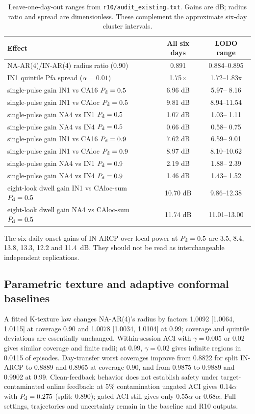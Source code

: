 \documentclass[10pt]{article}
\begin{document}
\begin{table}[htbp]
\centering\small\setlength{\tabcolsep}{4pt}
\caption{Leave-one-day-out ranges from \texttt{r10/audit\_existing.txt}. Gains are dB; radius ratio and spread are dimensionless. These complement the approximate six-day cluster intervals.}\label{tab:lodo}
\begin{tabular}{lcc}
\toprule
Effect & All six days & LODO range \\
\midrule
NA-AR(4)/IN-AR(4) radius ratio (0.90) & 0.891 & 0.884--0.895 \\
IN1 quintile Pfa spread ($\alpha=0.01$) & 1.75$\times$ & 1.72--1.83x \\
single-pulse gain IN1 vs CA16  $P_{\rm d}=0.5$ & 6.96 dB & 5.97-- 8.16 \\
single-pulse gain IN1 vs CAloc $P_{\rm d}=0.5$ & 9.81 dB & 8.94--11.54 \\
single-pulse gain NA4 vs IN1   $P_{\rm d}=0.5$ & 1.07 dB & 1.03-- 1.11 \\
single-pulse gain NA4 vs IN4   $P_{\rm d}=0.5$ & 0.66 dB & 0.58-- 0.75 \\
single-pulse gain IN1 vs CA16  $P_{\rm d}=0.9$ & 7.62 dB & 6.59-- 9.01 \\
single-pulse gain IN1 vs CAloc $P_{\rm d}=0.9$ & 8.97 dB & 8.10--10.62 \\
single-pulse gain NA4 vs IN1   $P_{\rm d}=0.9$ & 2.19 dB & 1.88-- 2.39 \\
single-pulse gain NA4 vs IN4   $P_{\rm d}=0.9$ & 1.46 dB & 1.43-- 1.52 \\
eight-look dwell gain IN1 vs CAloc-sum $P_{\rm d}=0.5$ & 10.70 dB & 9.86--12.38 \\
eight-look dwell gain NA4 vs CAloc-sum $P_{\rm d}=0.5$ & 11.74 dB & 11.01--13.00 \\
\bottomrule
\end{tabular}
\end{table}

The six daily onset gains of IN-ARCP over local power at $P_{\rm d}=0.5$ are 3.5, 8.4, 13.8, 13.3, 12.2 and 11.4~dB. They should not be read as interchangeable independent replications.

\subsection{Parametric texture and adaptive conformal baselines}
A fitted K-texture law changes NA-AR(4)'s radius by factors 1.0092 [1.0064, 1.0115] at coverage 0.90 and 1.0078 [1.0034, 1.0104] at 0.99; coverage and quintile deviations are essentially unchanged. Within-session ACI with $\gamma=0.005$ or 0.02 gives similar coverage and finite radii; at 0.99, $\gamma=0.02$ gives infinite regions in 0.0115 of episodes. Day-transfer worst coverages improve from 0.8822 for split IN-ARCP to 0.8889 and 0.8965 at coverage 0.90, and from 0.9875 to 0.9889 and 0.9902 at 0.99. Clean-feedback behavior does not establish safety under target-contaminated online feedback: at 5\% contamination ungated ACI gives $0.14\alpha$ with $P_{\rm d}=0.275$ (split: 0.890); gated ACI still gives only $0.55\alpha$ or $0.68\alpha$. Full settings, trajectories and uncertainty remain in the baseline and R10 outputs.
\end{document}
